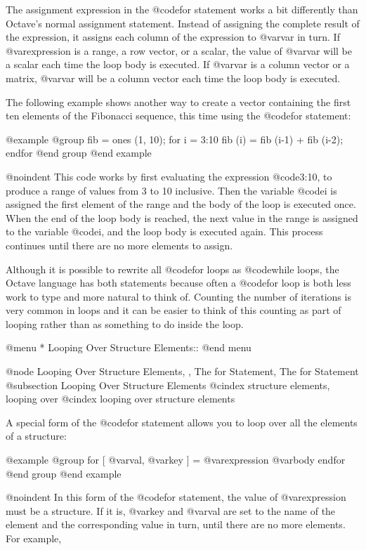The assignment expression in the @code{for} statement works a bit
differently than Octave's normal assignment statement.  Instead of
assigning the complete result of the expression, it assigns each column
of the expression to @var{var} in turn.  If @var{expression} is a range,
a row vector, or a scalar, the value of @var{var} will be a scalar each
time the loop body is executed.  If @var{var} is a column vector or a
matrix, @var{var} will be a column vector each time the loop body is
executed.

The following example shows another way to create a vector containing
the first ten elements of the Fibonacci sequence, this time using the
@code{for} statement:

@example
@group
fib = ones (1, 10);
for i = 3:10
  fib (i) = fib (i-1) + fib (i-2);
endfor
@end group
@end example

@noindent
This code works by first evaluating the expression @code{3:10}, to
produce a range of values from 3 to 10 inclusive.  Then the variable
@code{i} is assigned the first element of the range and the body of the
loop is executed once.  When the end of the loop body is reached, the
next value in the range is assigned to the variable @code{i}, and the
loop body is executed again.  This process continues until there are no
more elements to assign.

Although it is possible to rewrite all @code{for} loops as @code{while}
loops, the Octave language has both statements because often a
@code{for} loop is both less work to type and more natural to think of.
Counting the number of iterations is very common in loops and it can be
easier to think of this counting as part of looping rather than as
something to do inside the loop.

@menu
* Looping Over Structure Elements::  
@end menu

@node Looping Over Structure Elements,  , The for Statement, The for Statement
@subsection Looping Over Structure Elements
@cindex structure elements, looping over
@cindex looping over structure elements

A special form of the @code{for} statement allows you to loop over all
the elements of a structure:

@example
@group
for [ @var{val}, @var{key} ] = @var{expression}
  @var{body}
endfor
@end group
@end example

@noindent
In this form of the @code{for} statement, the value of @var{expression}
must be a structure.  If it is, @var{key} and @var{val} are set to the
name of the element and the corresponding value in turn, until there are
no more elements. For example,

